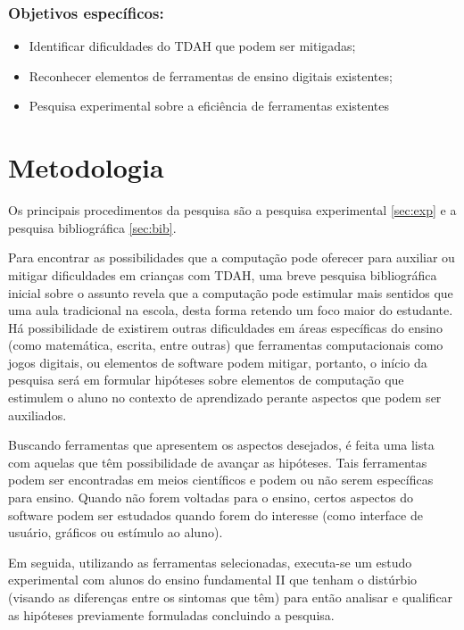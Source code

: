 \subsection{Objetivos específicos:}

\begin{itemize}
    \item Identificar dificuldades do TDAH que podem ser mitigadas;
    \item Reconhecer elementos de ferramentas de ensino digitais existentes;
    \item Pesquisa experimental sobre a eficiência de ferramentas existentes
\end{itemize}


\chapter{Metodologia}

Os principais procedimentos da pesquisa são a pesquisa experimental \ref{sec:exp} e a pesquisa bibliográfica \ref{sec:bib}.

Para encontrar as possibilidades que a computação pode oferecer para auxiliar ou mitigar dificuldades em crianças com TDAH, uma breve pesquisa bibliográfica inicial sobre o assunto revela que a computação pode estimular mais sentidos que uma aula tradicional na escola, desta forma retendo um foco maior do estudante. Há possibilidade de existirem outras dificuldades em áreas específicas do ensino (como matemática, escrita, entre outras) que ferramentas computacionais como jogos digitais, ou elementos de software podem mitigar, portanto, o início da pesquisa será em formular hipóteses sobre elementos de computação que estimulem o aluno no contexto de aprendizado perante aspectos que podem ser auxiliados.

Buscando ferramentas que apresentem os aspectos desejados, é feita uma lista com aquelas que têm possibilidade de avançar as hipóteses. Tais ferramentas podem ser encontradas em meios científicos e podem ou não serem específicas para ensino. Quando não forem voltadas para o ensino, certos aspectos do software podem ser estudados quando forem do interesse (como interface de usuário, gráficos ou estímulo ao aluno).

Em seguida, utilizando as ferramentas selecionadas, executa-se um estudo experimental com alunos do ensino fundamental II que tenham o distúrbio (visando as diferenças entre os sintomas que têm) para então analisar e qualificar as hipóteses previamente formuladas concluindo a pesquisa.
